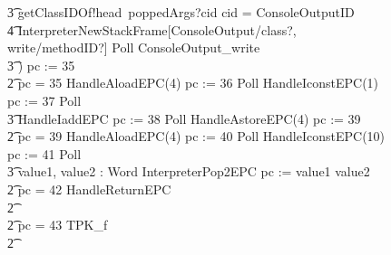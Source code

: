 \begin{figure}[tp!]
{\begin{circus}
    \t3 getClassIDOf!head~poppedArgs?cid \then \circif cid = ConsoleOutputID \circthen {} \\
    \t4 \lschexpract InterpreterNewStackFrame[ConsoleOutput/class?, write/methodID?] \rschexpract \circseq  Poll \circseq ConsoleOutput\_write \\
    \t3 \circfi) \circseq pc := 35 \\
    \t2 {} \circelse pc = 35 \circthen HandleAloadEPC(4) \circseq pc := 36 \circseq Poll \circseq HandleIconstEPC(1) \circseq pc := 37 \circseq Poll \circseq \\
    \t3 HandleIaddEPC \circseq pc := 38 \circseq Poll \circseq HandleAstoreEPC(4) \circseq pc := 39 \\
    \t2 {} \circelse pc = 39 \circthen HandleAloadEPC(4) \circseq pc := 40 \circseq Poll \circseq HandleIconstEPC(10) \circseq  pc := 41 \circseq Poll \circseq \\
    \t3 \circvar value1, value2 : Word \circspot InterpreterPop2EPC \circseq pc := \IF value1 \leq value2   \\
    \t2 {} \circelse pc = 42 \circthen HandleReturnEPC \\
    \t2 {} \cdots {} \\
    \t2 {} \circelse pc = 43 \circthen TPK\_f \\
    \t2 {} \cdots {} \\

\end{circus}}
\end{figure}
